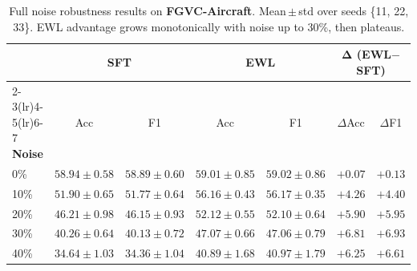 \begin{table}[h]
  \centering
  \caption{
    Full noise robustness results on \textbf{FGVC-Aircraft}.
    Mean\,$\pm$\,std over seeds \{11, 22, 33\}.
    EWL advantage grows monotonically with noise up to 30\%, then plateaus.
  }
  \label{tab:noise_aircraft_full}
  \setlength{\tabcolsep}{5pt}
  \begin{tabular}{lcccccc}
    \toprule
    & \multicolumn{2}{c}{\textbf{SFT}} & \multicolumn{2}{c}{\textbf{EWL}} & \multicolumn{2}{c}{$\boldsymbol{\Delta}$ \textbf{(EWL$-$SFT)}} \\
    \cmidrule(lr){2-3}\cmidrule(lr){4-5}\cmidrule(lr){6-7}
    \textbf{Noise} & Acc & F1 & Acc & F1 & $\Delta$Acc & $\Delta$F1 \\
    \midrule
    0\%  & $58.94{\pm}0.58$ & $58.89{\pm}0.60$ & $59.01{\pm}0.85$ & $59.02{\pm}0.86$ & $+0.07$ & $+0.13$ \\
    10\% & $51.90{\pm}0.65$ & $51.77{\pm}0.64$ & $56.16{\pm}0.43$ & $56.17{\pm}0.35$ & $\mathbf{+4.26}$ & $\mathbf{+4.40}$ \\
    20\% & $46.21{\pm}0.98$ & $46.15{\pm}0.93$ & $52.12{\pm}0.55$ & $52.10{\pm}0.64$ & $\mathbf{+5.90}$ & $\mathbf{+5.95}$ \\
    30\% & $40.26{\pm}0.64$ & $40.13{\pm}0.72$ & $47.07{\pm}0.66$ & $47.06{\pm}0.79$ & $\mathbf{+6.81}$ & $\mathbf{+6.93}$ \\
    40\% & $34.64{\pm}1.03$ & $34.36{\pm}1.04$ & $40.89{\pm}1.68$ & $40.97{\pm}1.79$ & $\mathbf{+6.25}$ & $\mathbf{+6.61}$ \\
    \bottomrule
  \end{tabular}
\end{table}

